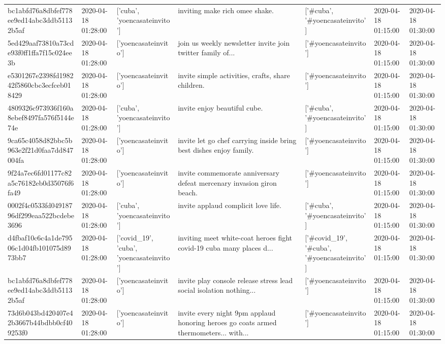 \begin{tabular}{lllllll}
bc1abfd76a8dbfef778ee9ed14abc3ddb51132b5af & 2020-04-18 01:28:00 & ['cuba', 'yoencasateinvito'] & inviting make rich omee shake. & ['#cuba', '#yoencasateinvito'] & 2020-04-18 01:15:00 & 2020-04-18 01:30:00 \\
5ed429aaf73810a73cde93f0ff1ffa7f15c024ee3b & 2020-04-18 01:28:00 & ['yoencasateinvito'] & join us weekly newsletter invite join twitter family of... & ['#yoencasateinvito'] & 2020-04-18 01:15:00 & 2020-04-18 01:30:00 \\
e5301267e2398fd198242f5860cbc3ecfceb018429 & 2020-04-18 01:28:00 & ['yoencasateinvito'] & invite simple activities, crafts, share children. & ['#yoencasateinvito'] & 2020-04-18 01:15:00 & 2020-04-18 01:30:00 \\
4809326c973936f160a8ebef8497fa576f5144e74e & 2020-04-18 01:28:00 & ['cuba', 'yoencasateinvito'] & invite enjoy beautiful cube. & ['#cuba', '#yoencasateinvito'] & 2020-04-18 01:15:00 & 2020-04-18 01:30:00 \\
9ca65c4058d82bbc5b963e2f21d0faa7dd847004fa & 2020-04-18 01:28:00 & ['yoencasateinvito'] & invite let go chef carrying inside bring best dishes enjoy family. & ['#yoencasateinvito'] & 2020-04-18 01:15:00 & 2020-04-18 01:30:00 \\
9f24a7ec6fd01177c82a5c76182eb0d35076f6fa49 & 2020-04-18 01:28:00 & ['yoencasateinvito'] & invite commemorate anniversary defeat mercenary invasion giron beach. & ['#yoencasateinvito'] & 2020-04-18 01:15:00 & 2020-04-18 01:30:00 \\
0002f4c0533fd04918796df299eaa522bcdebe3696 & 2020-04-18 01:28:00 & ['cuba', 'yoencasateinvito'] & invite applaud complicit love life. & ['#cuba', '#yoencasateinvito'] & 2020-04-18 01:15:00 & 2020-04-18 01:30:00 \\
d4fbaf10c6c4a1de79506c1d04fb101075d8973bb7 & 2020-04-18 01:28:00 & ['covid_19', 'cuba', 'yoencasateinvito'] & inviting meet white-coat heroes fight covid-19 cuba many places d... & ['#covid_19', '#cuba', '#yoencasateinvito'] & 2020-04-18 01:15:00 & 2020-04-18 01:30:00 \\
bc1abfd76a8dbfef778ee9ed14abc3ddb51132b5af & 2020-04-18 01:28:00 & ['yoencasateinvito'] & invite play console release stress lead social isolation nothing... & ['#yoencasateinvito'] & 2020-04-18 01:15:00 & 2020-04-18 01:30:00 \\
73d6b043bd420407e42b3667b44bdbb0cf409253f0 & 2020-04-18 01:28:00 & ['yoencasateinvito'] & invite every night 9pm applaud honoring heroes go coats armed thermometers... with... & ['#yoencasateinvito'] & 2020-04-18 01:15:00 & 2020-04-18 01:30:00 \\

\end{tabular}
